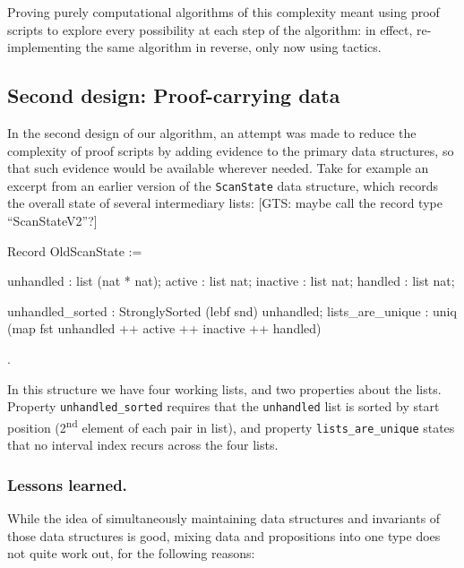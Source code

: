 \documentclass{llncs}
\newif\ifdraft\drafttrue  %
\newenvironment{MyCoqExampleStar}{\small \verbatim}{\endverbatim \normalsize}
\newcommand{\xcomment}[3]{\ifdraft\textcolor{#1}{[#2: #3]}\else\fi}
\newcommand{\gts}[1]{\xcomment{OliveGreen}{GTS}{#1}}
\begin{document}
Proving purely computational algorithms of this complexity meant using proof
scripts to explore every possibility at each step of the algorithm: in effect,
re-implementing the same algorithm in reverse, only now using tactics.

\subsection{Second design: Proof-carrying data}
\label{sec:depinduct}

In the second design of our algorithm, an attempt was made to reduce the
complexity of proof scripts by adding evidence to the primary data structures,
so that such evidence would be available wherever needed.  Take for example an
excerpt from an earlier version of the \texttt{ScanState} data structure,
which records the overall state of several intermediary lists:
\gts{maybe call the record type ``ScanStateV2''?}

\begin{MyCoqExampleStar}
Record OldScanState := {
    unhandled : list (nat * nat);
    active    : list nat;
    inactive  : list nat;
    handled   : list nat;

    unhandled_sorted : StronglySorted (lebf snd) unhandled;
    lists_are_unique : uniq (map fst unhandled ++ active ++
                             inactive ++ handled)
}.
\end{MyCoqExampleStar}

In this structure we have four working lists, and two properties about
the lists. Property \texttt{unhandled\_sorted} requires that the
\texttt{unhandled} list is sorted by start position
(2\textsuperscript{nd} element of each pair in list), and property
\texttt{lists\_are\_unique} states that no interval index recurs
across the four lists.

\subsubsection*{Lessons learned.}

While the idea of simultaneously maintaining data structures and
invariants of those data structures is good, mixing data and
propositions into one type does not quite work out, for the following
reasons: 
\end{document}
